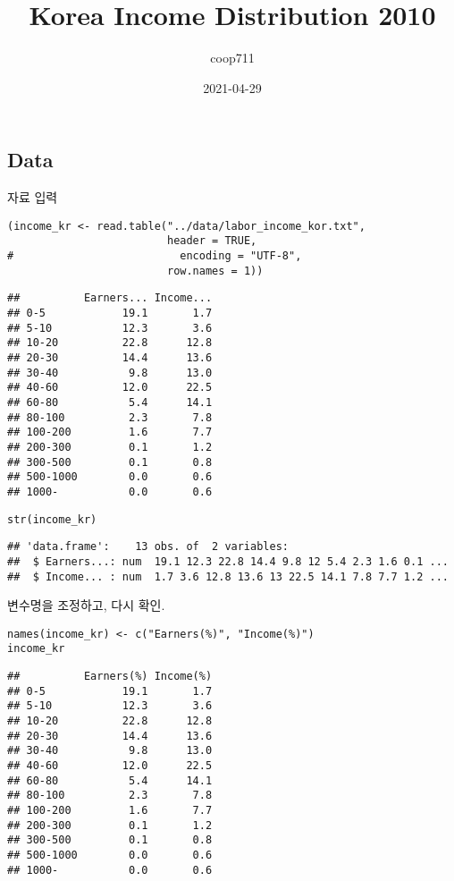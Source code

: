 \documentclass[
]{article}
\title{Korea Income Distribution 2010}
\author{coop711}
\date{2021-04-29}
\begin{document}
\maketitle

\hypertarget{data}{%
\subsection{Data}\label{data}}

자료 입력

\begin{verbatim}
(income_kr <- read.table("../data/labor_income_kor.txt", 
                         header = TRUE, 
#                          encoding = "UTF-8",
                         row.names = 1))
\end{verbatim}

\begin{verbatim}
##          Earners... Income...
## 0-5            19.1       1.7
## 5-10           12.3       3.6
## 10-20          22.8      12.8
## 20-30          14.4      13.6
## 30-40           9.8      13.0
## 40-60          12.0      22.5
## 60-80           5.4      14.1
## 80-100          2.3       7.8
## 100-200         1.6       7.7
## 200-300         0.1       1.2
## 300-500         0.1       0.8
## 500-1000        0.0       0.6
## 1000-           0.0       0.6
\end{verbatim}

\begin{verbatim}
str(income_kr)
\end{verbatim}

\begin{verbatim}
## 'data.frame':    13 obs. of  2 variables:
##  $ Earners...: num  19.1 12.3 22.8 14.4 9.8 12 5.4 2.3 1.6 0.1 ...
##  $ Income... : num  1.7 3.6 12.8 13.6 13 22.5 14.1 7.8 7.7 1.2 ...
\end{verbatim}

변수명을 조정하고, 다시 확인.

\begin{verbatim}
names(income_kr) <- c("Earners(%)", "Income(%)")
income_kr
\end{verbatim}

\begin{verbatim}
##          Earners(%) Income(%)
## 0-5            19.1       1.7
## 5-10           12.3       3.6
## 10-20          22.8      12.8
## 20-30          14.4      13.6
## 30-40           9.8      13.0
## 40-60          12.0      22.5
## 60-80           5.4      14.1
## 80-100          2.3       7.8
## 100-200         1.6       7.7
## 200-300         0.1       1.2
## 300-500         0.1       0.8
## 500-1000        0.0       0.6
## 1000-           0.0       0.6
\end{verbatim}
\end{document}
